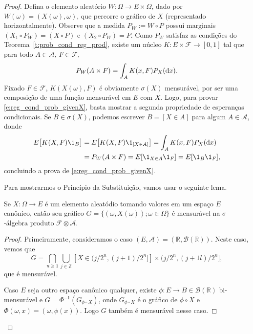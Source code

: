 \begin{proof}
  Defina o elemento aleatório $W: \Omega \to E \times \Omega$, dado por $W(\omega) = (X(\omega), \omega)$, que percorre o gráfico de $X$ (representado horizontalmente).
  Observe que a medida $P_W := W \circ P$ possui marginais $(X_1 \circ P_W) = (X \circ P)$ e $(X_2 \circ P_W) = P$.
  Como $P_W$ satisfaz as condições do Teorema~\ref{t:prob_cond_reg_prod}, existe um núcleo $K: E \times \mathcal{F} \to [0,1]$ tal que para todo $A \in \mathcal{A}$, $F \in \mathcal{F}$,
  \begin{equation}
    P_W(A \times F) = \int_A K(x, F) P_X (\mathop{}\!\mathrm{d} x).
  \end{equation}
  Fixado $F \in \mathcal{F}$, $K(X(\omega), F)$ é obviamente $\sigma(X)$ mensurável, por ser uma composição de uma função mensurável em $E$ com $X$.
  Logo, para provar \eqref{e:reg_cond_prob_givenX}, basta mostrar a segunda propriedade de esperanças condicionais.
  Se $B \in \sigma(X)$, podemos escrever $B = [X \in A]$ para algum $A \in \mathcal{A}$, donde
  \begin{equation}
    \begin{split}
      E\big[ K(X, F) \1_B \big] & = E\big[ K(X, F) \1_{[X \in A]} \big] = \int_A K(x, F) P_X(\d x)\\
      & = P_W (A \times F) = E[\1_{X \in A} \1_F] = E[\1_B \1_F],
    \end{split}
  \end{equation}
  concluindo a prova de \eqref{e:reg_cond_prob_givenX}.

  Para mostrarmos o Princípio da Substituição, vamos usar o seguinte lema.

  \begin{lemma}
    Se $X : \Omega \to E$ é um elemento aleatódio tomando valores em um espaço $E$ canônico, então seu gráfico $G = \{(\omega, X(\omega)); \omega \in \Omega\}$ é mensurável na $\sigma$-álgebra produto $\mathcal{F} \otimes \mathcal{A}$.
  \end{lemma}

  \begin{proof}
    Primeiramente, consideramos o caso $(E, \mathcal{A}) = (\mathbb{R}, \mathcal{B}(\mathbb{R}))$.
    Neste caso, vemos que
    \begin{equation}
      G = \bigcap_{n \geq 1} \bigcup_{j \in \mathbb{Z}} [X \in \big(j/2^n, (j+1)/2^n \big]] \times \big( j/2^n, (j+1l)/2^n \big],
    \end{equation}
    que é mensurável.

    Caso $E$ seja outro espaço canônico qualquer, existe $\phi: E \to B \in \mathcal{B}(\mathbb{R})$ bi-mensurável e $G = \Phi^{-1}(G_{\phi \circ X})$, onde $G_{\phi \circ X}$ é o gráfico de $\phi \circ X$ e $\Phi(\omega, x) = (\omega, \phi(x))$.
    Logo $G$ também é mensurável nesse caso.
  \end{proof}


\end{proof}
